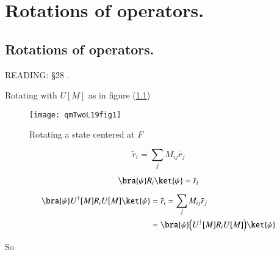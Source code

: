 %
%

\chapter{Rotations of operators.}
\label{chap:qmTwoL19}
{}
\date{Nov 16, 2011}

\beginArtWithToc

%
%
\section{Rotations of operators.}

READING: \S 28 \cite{desai2009quantum}.

Rotating with $U[M]$ as in figure (\ref{fig:qmTwoL19:qmTwoL19fig1})
\begin{figure}[htp]
   \centering
   \texttt{[image: qmTwoL19fig1]}
   \caption{Rotating a state centered at $F$}\label{fig:qmTwoL19:qmTwoL19fig1}
\end{figure}

\begin{equation}\label{eqn:qmTwoL19:10}
\tilde{r}_i = \sum_j M_{ij} \bar{r}_j
\end{equation}

\begin{equation}\label{eqn:qmTwoL19:30}
\bra{\psi} R_i \ket{\psi} = \bar{r}_i
\end{equation}

\begin{align*}
\bra{\psi} U^\dagger[M] R_i U[M] \ket{\psi}
&= \tilde{r}_i = \sum_j M_{ij} \bar{r}_j \\
&=
\bra{\psi} \Bigl( U^\dagger[M] R_i U[M] \Bigr) \ket{\psi}
\end{align*}

So

